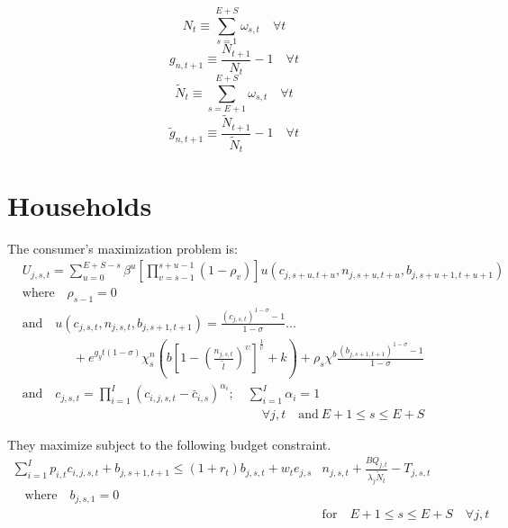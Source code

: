     \begin{equation}\label{EqPopDef}
      N_t\equiv\sum_{s=1}^{E+S} \omega_{s,t} \quad\forall t
    \end{equation}
    \begin{equation}\label{EqPopGrowth}
      g_{n,t+1} \equiv \frac{N_{t+1}}{N_t} - 1 \quad\forall t
    \end{equation}
    \begin{equation}\label{EqPopWkDef}
      \tilde{N}_t\equiv\sum_{s=E+1}^{E+S} \omega_{s,t} \quad\forall t
    \end{equation}
    \begin{equation}\label{EqPopWkGrowth}
      \tilde{g}_{n,t+1} \equiv \frac{\tilde{N}_{t+1}}{\tilde{N}_t} - 1 \quad\forall t
    \end{equation}


  \section{Households}
    The consumer's maximization problem is:
    \begin{equation}\label{EqUtilMax}
      \begin{split}
        &U_{j,s,t} = \sum_{u=0}^{E+S-s}\beta^u\left[\prod_{v=s-1}^{s+u-1}(1-\rho_v)\right] u\left(c_{j,s+u,t+u},n_{j,s+u,t+u},b_{j,s+u+1,t+u+1}\right) \\
        &\text{where}\quad \rho_{s-1}=0 \\
        &\text{and} \quad u\left(c_{j,s,t},n_{j,s,t},b_{j,s+1,t+1}\right) = \frac{\left(c_{j,s,t}\right)^{1-\sigma} - 1}{1-\sigma} ... \\
        &\qquad\qquad + e^{g_y t(1-\sigma)}\chi^n_s\left(b\left[1 - \left(\frac{n_{j,s,t}}{\tilde{l}}\right)^\upsilon\right]^\frac{1}{\upsilon} + k\right) + \rho_s\chi^b\frac{\left(b_{j,s+1,t+1}\right)^{1-\sigma} - 1}{1-\sigma} \\
        &\text{and} \quad c_{j,s,t} = \prod_{i=1}^I \left( c_{i,j,s,t} - \bar c_{i,s} \right) ^{\alpha_i}; \quad \sum_{i=1}^I \alpha_i = 1 \\
        &\quad\quad\quad\quad\quad\quad\quad\quad\quad\quad\quad\quad\quad\quad\quad\quad\quad\quad\quad\forall j,t\quad\text{and}\:E+1\leq s\leq E+S
      \end{split}
    \end{equation}

    They maximize subject to the following budget constraint.
    \begin{equation}\label{EqBC}
      \begin{split}
        \sum_{i=1}^I p_{i,t}c_{i,j,s,t} + b_{j,s+1,t+1} \leq \left(1 + r_t\right) b_{j,s,t} + w_t e_{j,s}&n_{j,s,t} + \frac{BQ_{j,t}}{\lambda_j\tilde{N}_t} - T_{j,s,t} \\
        \quad\text{where}\quad b_{j,s,1} = 0 \\
        &\text{for} \quad E+1\leq s \leq E+S \quad \forall j,t
      \end{split}
    \end{equation}

